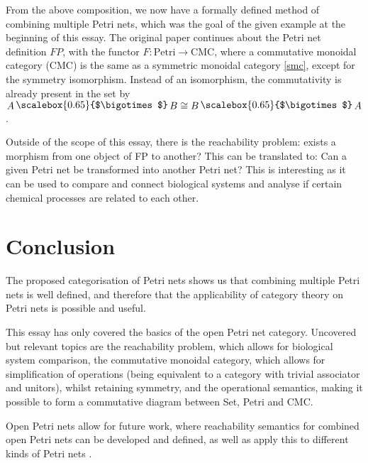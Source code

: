 \documentclass[utf8,british]{cms-essay}
\DeclareMathOperator*{\Motimes}{\text{\raisebox{0.25ex}{\scalebox{0.65}{$\bigotimes$}}}}
\begin{document}
\newpage

From the above composition, we now have a formally defined method of combining multiple Petri nets, which was the goal of the given example at the beginning of this essay. The original paper continues about the Petri net definition $FP$, with the functor $F: \mathrm{Petri} \rightarrow \mathrm{CMC}$, where a commutative monoidal category (CMC) is the same as a symmetric monoidal category \ref{smc}, except for the symmetry isomorphism. Instead of an isomorphism, the commutativity is already present in the set by $A \Motimes B \cong B \Motimes A$. 


Outside of the scope of this essay, there is the reachability problem: exists a morphism from one object of FP to another? This can be translated to: Can a given Petri net be transformed into another Petri net? This is interesting as it can be used to compare and connect biological systems and analyse if certain chemical processes are related to each other.

\section{Conclusion}
\label{sec:conclusion}

The proposed categorisation of Petri nets shows us that combining multiple Petri nets is well defined, and therefore that the applicability of category theory on Petri nets is possible and useful.

This essay has only covered the basics of the open Petri net category. Uncovered but relevant topics are the reachability problem, which allows for biological system comparison, the commutative monoidal category, which allows for simplification of operations (being equivalent to a category with trivial associator and unitors), whilst retaining symmetry, and the operational semantics, making it possible to form a commutative diagram between Set, Petri and CMC. 

Open Petri nets allow for future work, where reachability semantics for combined open Petri nets can be developed and defined, as well as apply this to different kinds of Petri nets \cite{baez2020open}.


\printbibliography{}


\begin{comment}
    Free symmetric monoidal category
    













    
\end{comment}
\end{document}
